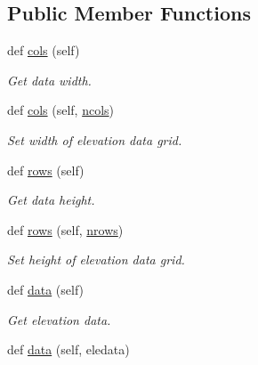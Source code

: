 \subsection*{Public Member Functions}
\begin{DoxyCompactItemize}
\item 
def \hyperlink{classbridges_1_1data__src__dependent_1_1elevation_1_1_elevation_data_a1cd79042f129e74b8ab5dae513a110ef}{cols} (self)
\begin{DoxyCompactList}\small\item\em Get data width. \end{DoxyCompactList}\item 
def \hyperlink{classbridges_1_1data__src__dependent_1_1elevation_1_1_elevation_data_a4e6bb9993e1e801ecbe7bd8f237b9803}{cols} (self, \hyperlink{classbridges_1_1data__src__dependent_1_1elevation_1_1_elevation_data_a1eb3bae4754a50ce00cf1022a9562c08}{ncols})
\begin{DoxyCompactList}\small\item\em Set width of elevation data grid. \end{DoxyCompactList}\item 
def \hyperlink{classbridges_1_1data__src__dependent_1_1elevation_1_1_elevation_data_a9bf62ed0d7447970ae25f0745cf23a6f}{rows} (self)
\begin{DoxyCompactList}\small\item\em Get data height. \end{DoxyCompactList}\item 
def \hyperlink{classbridges_1_1data__src__dependent_1_1elevation_1_1_elevation_data_a4276b1092945baea4a8ecaab81459880}{rows} (self, \hyperlink{classbridges_1_1data__src__dependent_1_1elevation_1_1_elevation_data_adc326f6bc8eb64eaaa6d5a83c7094d60}{nrows})
\begin{DoxyCompactList}\small\item\em Set height of elevation data grid. \end{DoxyCompactList}\item 
def \hyperlink{classbridges_1_1data__src__dependent_1_1elevation_1_1_elevation_data_abbf39d663f96397efbe26e91e63a2376}{data} (self)
\begin{DoxyCompactList}\small\item\em Get elevation data. \end{DoxyCompactList}\item 
def \hyperlink{classbridges_1_1data__src__dependent_1_1elevation_1_1_elevation_data_af3322b8eac79fe511c9f1ac83959b2c8}{data} (self, eledata)

\end{DoxyCompactItemize}
